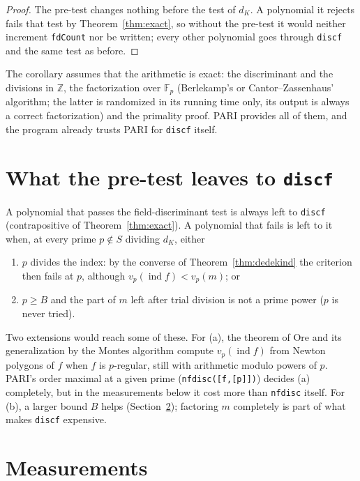 \documentclass[10pt,a4paper]{article}
\newcommand{\Fp}{\mathbb{F}_p}
\newcommand{\Z}{\mathbb{Z}}
\DeclareMathOperator{\ind}{ind}
\newcommand{\code}[1]{\texttt{#1}}
\theoremstyle{plain}
\theoremstyle{definition}
\begin{document}
\begin{proof}
The pre-test changes nothing before the test of $d_K$.  A polynomial it rejects fails that test by Theorem~\ref{thm:exact}, so
without the pre-test it would neither increment \code{fdCount} nor be written; every other polynomial goes through \code{discf} and
the same test as before.
\end{proof}

\noindent The corollary assumes that the arithmetic is exact: the discriminant and the divisions in $\Z$, the factorization over $\Fp$
(Berlekamp's or Cantor--Zassenhaus' algorithm; the latter is randomized in its running time only, its output is always a correct
factorization) and the primality proof.  PARI provides all of them, and the program already trusts PARI for \code{discf} itself.

\section{What the pre-test leaves to \texttt{discf}}\label{sec:limits}

A polynomial that passes the field-discriminant test is always left to \code{discf} (contrapositive of Theorem~\ref{thm:exact}).  A
polynomial that fails is left to it when, at every prime $p\notin S$ dividing $d_K$, either
\begin{enumerate}[nosep,label=(\alph*)]
\item $p$ divides the index: by the converse of Theorem~\ref{thm:dedekind} the criterion then fails at $p$, although
  $v_p(\ind f)<v_p(m)$; or
\item $p\geq B$ and the part of $m$ left after trial division is not a prime power ($p$ is never tried).
\end{enumerate}
Two extensions would reach some of these.  For (a), the theorem of Ore \cite{Ore} and its generalization by the Montes algorithm
\cite{GMN} compute $v_p(\ind f)$ from Newton polygons of $f$ when $f$ is $p$-regular, still with arithmetic modulo powers of $p$.  PARI's
order maximal at a given prime (\code{nfdisc([f,[p]])}) decides (a) completely, but in the measurements below it cost more than
\code{nfdisc} itself.  For (b), a larger bound $B$ helps (Section~\ref{sec:numbers}); factoring $m$ completely is part of what makes
\code{discf} expensive.

\section{Measurements}\label{sec:numbers}
\end{document}
